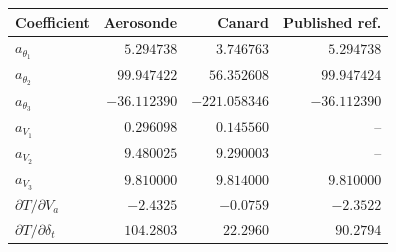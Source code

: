 \begin{tabular}{lrrr}
\toprule
Coefficient & Aerosonde & Canard & Published ref. \\
\midrule
$a_{\theta_1}$ & $5.294738$ & $3.746763$ & $5.294738$ \\
$a_{\theta_2}$ & $99.947422$ & $56.352608$ & $99.947424$ \\
$a_{\theta_3}$ & $-36.112390$ & $-221.058346$ & $-36.112390$ \\
$a_{V_1}$ & $0.296098$ & $0.145560$ & -- \\
$a_{V_2}$ & $9.480025$ & $9.290003$ & -- \\
$a_{V_3}$ & $9.810000$ & $9.814000$ & $9.810000$ \\
\midrule
$\partial T/\partial V_a$ & $-2.4325$ & $-0.0759$ & $-2.3522$ \\
$\partial T/\partial \delta_t$ & $104.2803$ & $22.2960$ & $90.2794$ \\
\bottomrule
\end{tabular}
